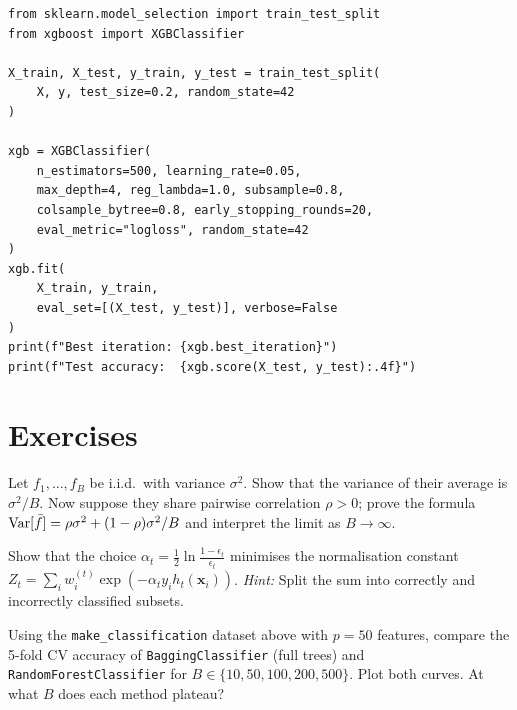 \begin{codeblock}[title=\textbf{XGBoost with Early Stopping}]
\begin{verbatim}
from sklearn.model_selection import train_test_split
from xgboost import XGBClassifier

X_train, X_test, y_train, y_test = train_test_split(
    X, y, test_size=0.2, random_state=42
)

xgb = XGBClassifier(
    n_estimators=500, learning_rate=0.05,
    max_depth=4, reg_lambda=1.0, subsample=0.8,
    colsample_bytree=0.8, early_stopping_rounds=20,
    eval_metric="logloss", random_state=42
)
xgb.fit(
    X_train, y_train,
    eval_set=[(X_test, y_test)], verbose=False
)
print(f"Best iteration: {xgb.best_iteration}")
print(f"Test accuracy:  {xgb.score(X_test, y_test):.4f}")
\end{verbatim}
\end{codeblock}

\section{Exercises}

\begin{exercise}
Let $f_1,\dots,f_B$ be i.i.d.\ with variance $\sigma^2$. Show that the variance of their average is $\sigma^2/B$. Now suppose they share pairwise correlation $\rho>0$; prove the formula $\mathrm{Var}[\bar f]=\rho\sigma^2+(1-\rho)\sigma^2/B$ and interpret the limit as $B\to\infty$.
\end{exercise}

\begin{exercise}
Show that the choice $\alpha_t=\frac{1}{2}\ln\frac{1-\epsilon_t}{\epsilon_t}$ minimises the normalisation constant $Z_t=\sum_i w_i^{(t)}\exp(-\alpha_t y_i h_t(\bm{x}_i))$. \emph{Hint:} Split the sum into correctly and incorrectly classified subsets.
\end{exercise}

\begin{exercise}
Using the \texttt{make\_classification} dataset above with $p=50$ features, compare the 5-fold CV accuracy of \texttt{BaggingClassifier} (full trees) and \texttt{RandomForestClassifier} for $B\in\{10,50,100,200,500\}$. Plot both curves. At what $B$ does each method plateau?
\end{exercise}

